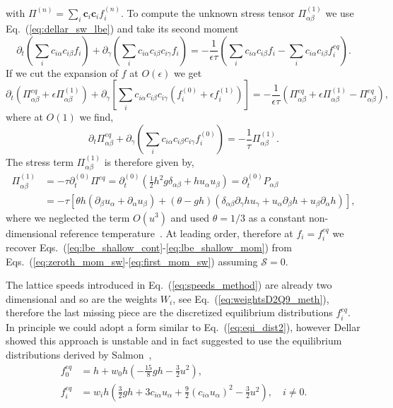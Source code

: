 with $\Pi^{(n)} = \sum_i \mathbf{c}_i\mathbf{c}_i f_i^{(n)}$.
To compute the unknown stress tensor $\Pi^{(1)}_{\alpha\beta}$ we use Eq.~(\ref{eq:dellar_sw_lbe}) and take its second moment
\begin{equation}
    \partial_t \left(\sum_i c_{i\alpha}c_{i\beta} f_i\right) + \partial_{\gamma}\left(\sum_i c_{i\alpha}c_{i\beta}c_{i\gamma} f_i\right) = -\frac{1}{\epsilon\tau}\left(\sum_i c_{i\alpha}c_{i\beta} f_i - \sum_ic_{i\alpha}c_{i\beta} f_i^{eq}\right).
\end{equation}
If we cut the expansion of $f$ at $O(\epsilon)$ we get
\begin{equation}
    \partial_t\left(\Pi^{eq}_{\alpha\beta} + \epsilon\Pi^{(1)}_{\alpha\beta}\right) + \partial_{\gamma}\left[\sum_i c_{i\alpha}c_{i\beta}c_{i\gamma} (f^{(0)}_i + \epsilon f^{(1)}_i)\right] = -\frac{1}{\epsilon\tau}\left(\Pi^{eq}_{\alpha\beta} + \epsilon\Pi^{(1)}_{\alpha\beta} - \Pi^{eq}_{\alpha\beta}\right),
\end{equation}
where at $O(1)$ we find,
\begin{equation}
    \partial_t\Pi^{eq}_{\alpha\beta} + \partial_{\gamma}\left(\sum_i c_{i\alpha}c_{i\beta}c_{i\gamma} f^{(0)}_i\right) = -\frac{1}{\tau}\Pi^{(1)}_{\alpha\beta}.
\end{equation}
The stress term $\Pi_{\alpha\beta}^{(1)}$ is therefore given by, 
\begin{align}
    \Pi^{(1)}_{\alpha\beta} &= -\tau\partial_t^{(0)}\Pi^{eq} = \partial_t^{(0)}\left(\frac{1}{2}h^2 g\delta_{\alpha\beta} + h u_{\alpha}u_{\beta}\right) =  \partial_t^{(0)}P_{\alpha\beta} \\
     &= -\tau\left[\theta h(\partial_{\beta}u_{\alpha} + \partial_{\alpha}u_{\beta}) + \left(\theta - gh\right)(\delta_{\alpha\beta}\partial_{\gamma}h u_{\gamma} + u_{\alpha}\partial_{\beta}h + u_{\beta}\partial_{\alpha}h)\right],
\end{align}
where we neglected the term $O(u^3)$ and used $\theta = 1/3$ as a constant non-dimensional reference temperature~\cite{dellarNonhydrodynamicModesPriori2002}.
At leading order, therefore at $f_i = f_i^{eq}$ we recover Eqs.~(\ref{eq:lbe_shallow_cont}-\ref{eq:lbe_shallow_mom}) from Eqs.~(\ref{eq:zeroth_mom_sw}-\ref{eq:first_mom_sw}) assuming $\mathcal{S} = 0$.

The lattice speeds introduced in Eq.~(\ref{eq:speeds_method}) are already two dimensional and so are the weights $W_i$, see Eq.~(\ref{eq:weightsD2Q9_meth}), therefore the last missing piece are the discretized equilibrium distributions $f_i^{eq}$.
In principle we could adopt a form similar to Eq.~(\ref{eq:eqi_dist2}), however Dellar showed this approach is unstable and in fact suggested to use the equilibrium distributions derived by Salmon~\cite{dellarNonhydrodynamicModesPriori2002, salmonLatticeBoltzmannMethod1999},
\begin{align}
    f^{eq}_0 &= h + w_0h\left(-\frac{15}{8}gh - \frac{3}{2}u^2\right),\\
    f^{eq}_i &= w_i h\left(\frac{3}{2}gh + 3 c_{i\alpha}u_{\alpha} + \frac{9}{2}(c_{i\alpha}u_{\alpha})^2 - \frac{3}{2}u^2\right), \quad i\neq 0 .
\end{align}

